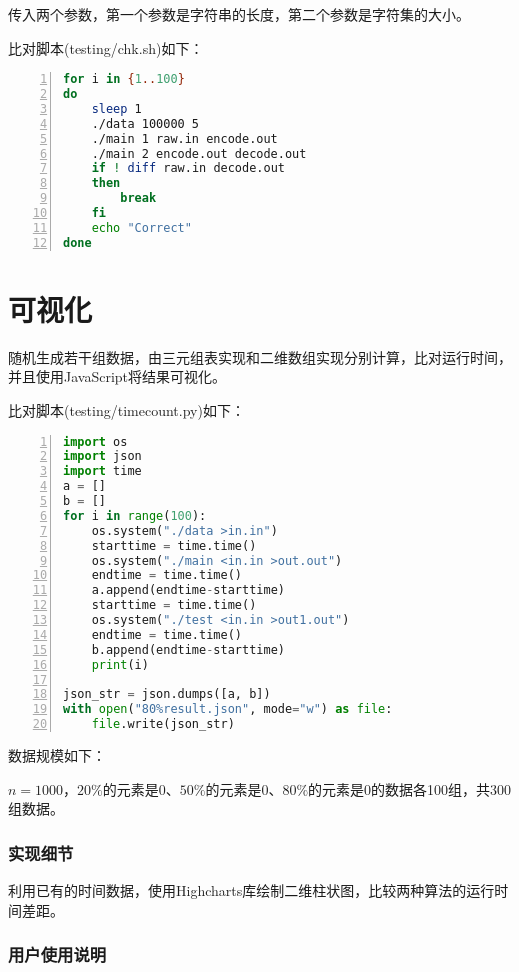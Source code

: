 \documentclass{article}
\begin{document}
传入两个参数，第一个参数是字符串的长度，第二个参数是字符集的大小。

比对脚本(testing/chk.sh)如下：

\begin{lstlisting}[language={bash},
    numbers=left,
    numberstyle=\tiny\consolas,
    basicstyle=\small\consolas]
for i in {1..100}
do
    sleep 1
    ./data 100000 5
    ./main 1 raw.in encode.out
    ./main 2 encode.out decode.out
    if ! diff raw.in decode.out
    then
        break
    fi
    echo "Correct"
done
\end{lstlisting}

\section{可视化}

随机生成若干组数据，由三元组表实现和二维数组实现分别计算，比对运行时间，并且使用JavaScript将结果可视化。

比对脚本(testing/timecount.py)如下：

\begin{lstlisting}[language={python},
    numbers=left,
    numberstyle=\tiny\consolas,
    basicstyle=\small\consolas]
import os
import json
import time
a = []
b = []
for i in range(100):
    os.system("./data >in.in")
    starttime = time.time()
    os.system("./main <in.in >out.out")
    endtime = time.time()
    a.append(endtime-starttime)
    starttime = time.time()
    os.system("./test <in.in >out1.out")
    endtime = time.time()
    b.append(endtime-starttime)
    print(i)

json_str = json.dumps([a, b])
with open("80%result.json", mode="w") as file:
    file.write(json_str)
\end{lstlisting}

数据规模如下：

$n=1000$，$20\%$的元素是0、$50\%$的元素是0、$80\%$的元素是0的数据各100组，共300组数据。

\subsubsection{实现细节}

利用已有的时间数据，使用Highcharts库绘制二维柱状图，比较两种算法的运行时间差距。

\subsubsection{用户使用说明}
\end{document}
